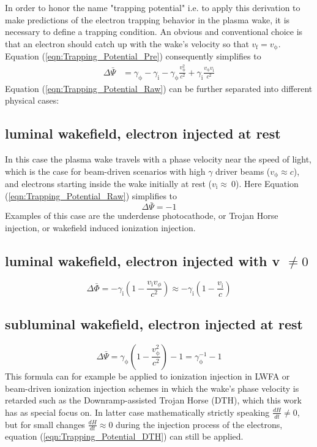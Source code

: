 In order to honor the name "trapping potential" i.e. to apply this derivation to make predictions of the electron trapping behavior in the plasma wake, it is necessary to define a trapping condition. 
An obvious and conventional choice is that an electron should catch up with the wake's velocity so that 
$v_\mathrm{f}=v_\mathrm{\phi}$.
Equation (\ref{eqn:Trapping_Potential_Pre}) consequently simplifies to 
\begin{align}
\label{eqn:Trapping_Potential_Raw}
\Delta \bar{\Psi}&= \gamma_\mathrm{\phi}-\gamma_\mathrm{i}-\gamma_\mathrm{\phi}\frac{v_\mathrm{\phi}^2}{c^2}+\gamma_\mathrm{i}\frac{v_\mathrm{\phi}v_\mathrm{i}}{c^2} 
\end{align}
Equation (\ref{eqn:Trapping_Potential_Raw}) can be further separated into different physical cases:
\subsection*{luminal wakefield, electron injected  at rest}
In this case the plasma wake travels with a phase velocity near the speed of light, which is the case for beam-driven scenarios with high $\gamma$ driver beams ($v_\mathrm{\phi} \approx c$), and electrons starting inside the wake initially at rest ($v_\mathrm{i} \approx \ 0$).
Here Equation (\ref{eqn:Trapping_Potential_Raw}) simplifies to
\begin{equation}
\label{eqn:Trapping_Potential_TH}
\Delta \bar{\Psi}=-1
\end{equation}
Examples of this case are the underdense photocathode, or Trojan Horse injection\cite{Hidding_PRL_2012}, or wakefield induced ionization injection\cite{MartinezdelaOssa2014231}.

\subsection*{luminal wakefield, electron injected  with v $\neq 0$}
\begin{equation}
\Delta \bar{\Phi}= -\gamma_\mathrm{i}(1-\frac{v_\mathrm{i}v_\phi}{c^2})\approx -\gamma_\mathrm{i}(1-\frac{v_\mathrm{i}}{c})
\end{equation}
\subsection*{subluminal wakefield, electron injected at rest}

\begin{equation}
\label{eqn:Trapping_Potential_DTH}
\Delta \bar{\Psi}=\gamma_\mathrm{\phi}(1-\frac{v_\mathrm{\phi}^2}{c^2})-1=\gamma_\mathrm{\phi}^{-1}-1
\end{equation}
This formula can for example be applied to ionization injection in LWFA\cite{PakPRL2012} or beam-driven ionization injection schemes in which the wake's phase velocity is retarded such as the Downramp-assisted Trojan Horse (DTH)\cite{DTH}, which this work has as special focus on. In latter case mathematically strictly speaking $\frac{d H}{dt}\neq0 $, but for small changes $\frac{dH}{dt}\approx 0$ during the injection process of the electrons, equation (\ref{eqn:Trapping_Potential_DTH}) can still be applied.

